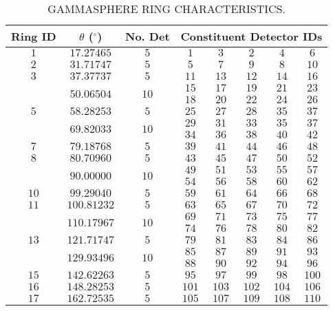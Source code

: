 \begin{table}
\caption{GAMMASPHERE RING CHARACTERISTICS.\label{tbl:app1-gs-rings}}
\begin{center}
\begin{tabular}{|c|c|c|c|c|c|c|c|}
\hline
\hline
Ring ID & $\theta$ ($^{\circ}$) & No. Det&\multicolumn{5}{|c|}{Constituent Detector IDs}\\ 
\hline{}$1$&$17.27465$&$5$&$1$&$3$&$2$&$4$&$6$\\
\hline{}$2$&$31.71747$&$5$&$5$&$7$&$9$&$8$&$10$\\
\hline{}$3$&$37.37737$&$5$&$11$&$13$&$12$&$14$&$16$\\
\hline{}\multirow{2}{*}{$4$}&\multirow{2}{*}{$50.06504$}&\multirow{2}{*}{$10$}&$15$&$17$&$19$&$21$&$23$\\
&&&$18$&$20$&$22$&$24$&$26$\\
\hline{}$5$&$58.28253$&$5$&$25$&$27$&$28$&$35$&$37$\\
\hline{}\multirow{2}{*}{$6$}&\multirow{2}{*}{$69.82033$}&\multirow{2}{*}{$10$}&$29$&$31$&$33$&$35$&$37$\\
&&&$34$&$36$&$38$&$40$&$42$\\
\hline{}$7$&$79.18768$&$5$&$39$&$41$&$44$&$46$&$48$\\
\hline{}$8$&$80.70960$&$5$&$43$&$45$&$47$&$50$&$52$\\
\hline{}\multirow{2}{*}{$9$}&\multirow{2}{*}{$90.00000$}&\multirow{2}{*}{$10$}&$49$&$51$&$53$&$55$&$57$ \\
&&&$54$&$56$&$58$&$60$&$62$\\
\hline{}$10$&$99.29040$&$5$&$59$&$61$&$64$&$66$&$68$\\
\hline{}$11$&$100.81232$&$5$&$63$&$65$&$67$&$70$&$72$\\
\hline{}\multirow{2}{*}{$12$}&\multirow{2}{*}{$110.17967$}&\multirow{2}{*}{$10$}&$69$&$71$&$73$&$75$&$77$\\
&&&$74$&$76$&$78$&$80$&$82$\\
\hline{}$13$&$121.71747$&$5$&$79$&$81$&$83$&$84$&$86$\\
\hline{}\multirow{2}{*}{$14$}&\multirow{2}{*}{$129.93496$}&\multirow{2}{*}{$10$}&$85$&$87$&$89$&$91$&$93$\\
&&&$88$&$90$&$92$&$94$&$96$\\
\hline{}$15$&$142.62263$&$5$&$95$&$97$&$99$&$98$&$100$\\
\hline{}$16$&$148.28253$&$5$&$101$&$103$&$102$&$104$&$106$\\
\hline{}$17$&$162.72535$&$5$&$105$&$107$&$109$&$108$&$110$\\
\hline
\hline
\end{tabular}
\end{center}
\end{table}

